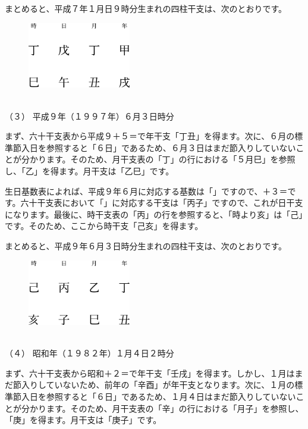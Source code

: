 \documentclass[a5paper,11pt,dvipdfmx]{tarticle}
\begin{document}
まとめると、平成７年１月日９時分生まれの四柱干支は、次のとおりです。

\begin{figure}[h]
  \includegraphics[width=45mm,angle=90]{figs/figure3-5.eps}
\end{figure}

\noindent
\\（３） 平成９年（１９９７年）６月３日時分

まず、六十干支表から平成９＋５＝で年干支「丁丑」を得ます。次に、６月の標準節入日を参照すると「６日」であるため、６月３日はまだ節入りしていないことが分かります。そのため、月干支表の「丁」の行における「５月巳」を参照し、「乙」を得ます。月干支は「乙巳」です。

生日基数表によれば、平成９年６月に対応する基数は「」ですので、＋３＝です。六十干支表において「」に対応する干支は「丙子」ですので、これが日干支になります。最後に、時干支表の「丙」の行を参照すると、「時より亥」は「己」です。そのため、ここから時干支「己亥」を得ます。

まとめると、平成９年６月３日時分生まれの四柱干支は、次のとおりです。

\begin{figure}[h]
  \includegraphics[width=45mm,angle=90]{figs/figure3-6.eps}
\end{figure}

\noindent
\\（４） 昭和年（１９８２年）１月４日２時分

まず、六十干支表から昭和＋２＝で年干支「壬戌」を得ます。しかし、１月はまだ節入りしていないため、前年の「辛酉」が年干支となります。次に、１月の標準節入日を参照すると「６日」であるため、１月４日はまだ節入りしていないことが分かります。そのため、月干支表の「辛」の行における「月子」を参照し、「庚」を得ます。月干支は「庚子」です。
\end{document}
